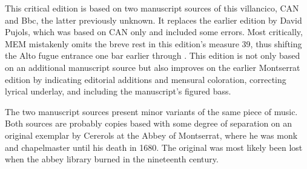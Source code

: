 
\begin{notesources}

\begin{source}
\end{source}

\begin{source}
\end{source}

\begin{source}
\end{source}

\end{notesources}

This critical edition is based on two manuscript sources of this villancico, 
CAN and Bbc, the latter previously unknown.
It replaces the earlier edition by David Pujols, which was based on CAN only 
and included some errors.
Most critically, MEM mistakenly omits the breve rest in this edition's measure 
39, thus shifting the Alto fugue entrance one bar earlier through .
This edition is not only based on an additional manuscript source but also 
improves on the earlier Montserrat edition by indicating editorial additions 
and mensural coloration, correcting lyrical underlay, and including the 
manuscript's figured bass.

The two manuscript sources present minor variants of the same piece of music.
Both sources are probably copies based with some degree of separation on an 
original exemplar by Cererols at the Abbey of Montserrat, where he was monk and 
chapelmaster until his death in 1680.%
  \autocite{Bonastre:CererolsSymposium}
The original was most likely been lost when the abbey library burned in the 
nineteenth century.

